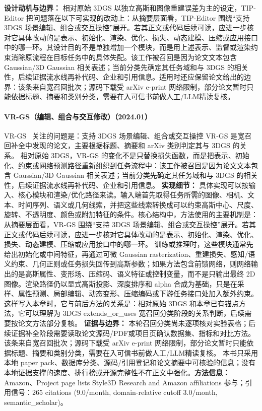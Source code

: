 \textbf{设计动机与边界：} 相对原始 3DGS 以独立高斯和图像重建误差为主的设定，TIP-Editor 把问题落在以下可实现的改动上：从摘要层面看，TIP-Editor 围绕“支持 3DGS 场景编辑、组合或交互操控”展开。若其正文或代码后续可读，应进一步核对它具体改动的是表示、初始化、渲染、优化、损失、动态建模、压缩或应用接口中的哪一环。其设计目的不是单独增加一个模块，而是用上述表示、监督或渲染约束消除原流程在目标任务中的具体失配。该工作被召回是因为论文文本包含 Gaussian/3D Gaussian 相关表述；当前分类先确定其任务域和与 3DGS 的相关性，后续证据流水线再补代码、企业和引用信息。适用时还应保留论文给出的边界：该条来自宽召回批次；源码下载受 arXiv e-print 网络限制，部分论文暂时只能依据标题、摘要和类别分类，需要在入可信书前做人工/LLM精读复核。
\paragraph{VR-GS（编辑、组合与交互修改）（2024.01）}
VR-GS~\cite{2401_16663} 关注的问题是：支持 3DGS 场景编辑、组合或交互操控 VR-GS 是宽召回补全中发现的论文，主要根据标题、摘要和 arXiv 类别判定其与 3DGS 的关系。
相对原始 3DGS，VR-GS 的变化不是只替换损失函数，而是把表示、初始化、约束或网络预测路径重新组织到任务流程中：该工作被召回是因为论文文本包含 Gaussian/3D Gaussian 相关表述；当前分类先确定其任务域和与 3DGS 的相关性，后续证据流水线再补代码、企业和引用信息。
\textbf{实现细节：} 具体实现可以按输入、核心模块和渲染/优化路径来读。输入端首先取得任务所需的图像、相机、文本、时间序列、语义或几何线索，并把这些线索转换成可以约束高斯中心、尺度、旋转、不透明度、颜色或附加特征的条件。核心结构中，方法使用的主要机制是：从摘要层面看，VR-GS 围绕“支持 3DGS 场景编辑、组合或交互操控”展开。若其正文或代码后续可读，应进一步核对它具体改动的是表示、初始化、渲染、优化、损失、动态建模、压缩或应用接口中的哪一环。 训练或推理时，这些模块通常先给出初始化或中间特征，再通过可微 Gaussian rasterization、重建损失、感知/语义约束、几何正则或任务损失回传到高斯参数；如果方法包含前馈网络，则网络输出的是高斯属性、变形场、压缩码、语义特征或控制变量，而不是只输出最终 2D 图像。渲染路径仍以显式高斯投影、深度排序和 alpha 合成为基础，只是在采样、属性预测、局部编辑、动态变形、压缩编码或下游任务接口处加入额外约束。这样写入本章时，它与前后方法的关系是：相对原始 3DGS 和本章已有锚点方法，它可以理解为 3DGS extends\_or\_uses 宽召回分类阶段的关系判断，后续需要按论文方法部分复核。
\textbf{证据与边界：} 本轮召回分类尚未逐项核对实验表格；后续证据补全阶段需要读取论文源码/PDF或项目页确认数据集、指标和对比方法。 该条来自宽召回批次；源码下载受 arXiv e-print 网络限制，部分论文暂时只能依据标题、摘要和类别分类，需要在入可信书前做人工/LLM精读复核。 本书只采用本地 paper pack、数据库分类、源码/引用登记和论文摘要中可核验的信息；没有本地证据支撑的速度、排行榜或开源完整性不在正文中强化。\textbf{方法信息：} Amazon、Project page lists Style3D Research and Amazon affiliations 参与；引用信号：265 citations (9.0/month, domain-relative cutoff 3.0/month, semantic\_scholar)。
